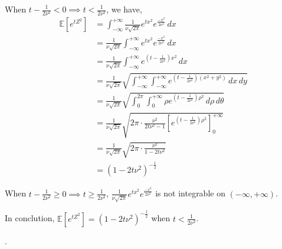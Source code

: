 When $t-\frac{1}{2\nu^2}<0\implies t<\frac{1}{2\nu^2}$, we have,
\begin{align}
    \nonumber \mathbb{E}\left[ e^{tZ^2} \right]&=\int_{-\infty }^{+\infty }\frac{1}{\nu \sqrt{2\pi}}e^{tx^2}e^{\frac{-x^2}{2\nu ^2}}\,dx\\
    \nonumber &=\frac{1}{\nu \sqrt{2\pi}}\int_{-\infty }^{+\infty }e^{tx^2}e^{\frac{-x^2}{2\nu^2}}\,dx\\
    \nonumber &=\frac{1}{\nu \sqrt{2\pi}}\int_{-\infty }^{+\infty }e^{(t-\frac{1}{2\nu^2})x^2}\,dx\\
    \nonumber &=\frac{1}{\nu \sqrt{2\pi}}\sqrt{\int_{-\infty }^{+\infty }\int_{-\infty }^{+\infty }e^{(t-\frac{1}{2\nu^2})(x^2+y^2)}\,dx\,dy}\\
    \nonumber &=\frac{1}{\nu \sqrt{2\pi}}\sqrt{ \int_{0}^{2\pi}\int_{0 }^{+\infty }\rho e^{(t-\frac{1}{2\nu^2})\rho^2}\,d\rho\,d\theta   }\\
    \nonumber &=\frac{1}{\nu \sqrt{2\pi}}\sqrt{ 2\pi\cdot\frac{\nu^2}{2t\nu^2-1}\left[e^{ (t-\frac{1}{2\nu^2})\rho^2}\right]_{0}^{+\infty} }\\
    \nonumber &=\frac{1}{\nu \sqrt{2\pi}}\sqrt{2\pi\cdot\frac{\nu^2}{1-2t\nu^2}}\\
    \nonumber &=(1-2t\nu^2)^{-\frac{1}{2}}
\end{align}

When $t-\frac{1}{2\nu^2}\ge0\implies t\ge\frac{1}{2\nu^2}$, %
$\frac{1}{\nu \sqrt{2\pi}}e^{tx^2}e^{\frac{-x^2}{2\nu ^2}}$ is not integrable on $(-\infty, +\infty )$.%


In conclution, $\mathbb{E}\left[ e^{tZ^2} \right]=(1-2t\nu^2)^{-\frac{1}{2}}$ when $t<\frac{1}{2\nu^2}$.

.

